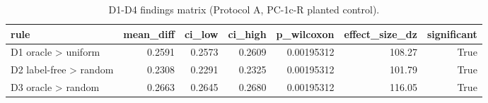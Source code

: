 \begin{table}[t]
\centering
\begin{tabular}{lrrrrrr}
\hline
rule & mean\_diff & ci\_low & ci\_high & p\_wilcoxon & effect\_size\_dz & significant \\
\hline
D1 oracle > uniform & 0.2591 & 0.2573 & 0.2609 & 0.00195312 & 108.27 & True \\
D2 label-free > random & 0.2308 & 0.2291 & 0.2325 & 0.00195312 & 101.79 & True \\
D3 oracle > random & 0.2663 & 0.2645 & 0.2680 & 0.00195312 & 116.05 & True \\
\hline
\end{tabular}
\caption{D1-D4 findings matrix (Protocol A, PC-1c-R planted control).}
\end{table}
